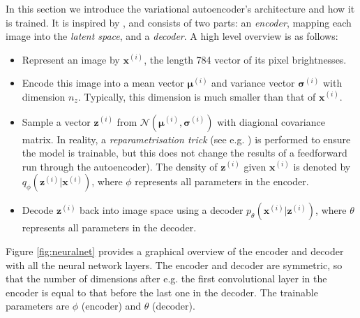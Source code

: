 \documentclass[]{article}
\begin{document}
In this section we introduce the variational autoencoder's architecture and how it is trained. It is inspired by \cite{notes, frans, altosaar, shafkat}, and consists of two parts: an \textit{encoder}, mapping each image into the \textit{latent space}, and a \textit{decoder}. A high level overview is as follows:
\begin{itemize}
\item Represent an image by $\bm{x}^{(i)}$, the length 784 vector of its pixel brightnesses.
\item Encode this image into a mean vector $\bm{\mu}^{(i)}$ and variance vector $\bm{\sigma}^{(i)}$ with dimension $n_z$. Typically, this dimension is much smaller than that of $\bm{x}^{(i)}$. 
\item Sample a vector $\bm{z}^{(i)}$ from $\mathcal{N}(\bm{\mu}^{(i)}, \bm{\sigma}^{(i)})$ with diagional covariance matrix. In reality, a \textit{reparametrisation trick} (see e.g. \cite{notes}) is performed to ensure the model is trainable, but this does not change the results of a feedforward run through the autoencoder). The density of $\bm{z}^{(i)}$ given $\bm{x}^{(i)}$ is denoted by $q_{\phi}(\bm{z}^{(i)}|\bm{x}^{(i)})$, where $\phi$ represents all parameters in the encoder.
\item Decode $\bm{z}^{(i)}$ back into image space using a decoder $p_{\theta}(\bm{x}^{(i)}|\bm{z}^{(i)})$, where $\theta$ represents all parameters in the decoder.
\end{itemize}
Figure \ref{fig:neuralnet} provides a graphical overview of the encoder and decoder with all the neural network layers. The encoder and decoder are symmetric, so that the number of dimensions after e.g. the first convolutional layer in the encoder is equal to that before the last one in the decoder. The trainable parameters are $\phi$ (encoder) and $\theta$ (decoder).  
\end{document}
